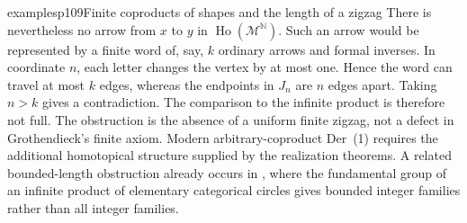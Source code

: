 \begin{dcomment}{examples}{p109}{Finite coproducts of shapes and the length of a zigzag}
There is nevertheless no arrow from $x$ to $y$ in $\operatorname{Ho}(\mathcal M^{\mathbb N})$. Such an arrow would be represented by a finite word of, say, $k$ ordinary arrows and formal inverses. In coordinate $n$, each letter changes the vertex by at most one. Hence the word can travel at most $k$ edges, whereas the endpoints in $J_n$ are $n$ edges apart. Taking $n>k$ gives a contradiction. The comparison to the infinite product is therefore not full. The obstruction is the absence of a uniform finite zigzag, not a defect in Grothendieck's finite axiom. Modern arbitrary-coproduct Der~(1) requires the additional homotopical structure supplied by the realization theorems. A related bounded-length obstruction already occurs in \citet[p.~307]{Thomason1980}, where the fundamental group of an infinite product of elementary categorical circles gives bounded integer families rather than all integer families.
\end{dcomment}

